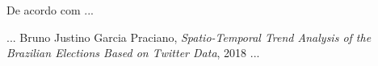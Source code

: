 De acordo com \cite{praciano2018spatio}...
\begin{thebibliography}{99}
...
 Bruno Justino Garcia Praciano, \emph{Spatio-Temporal Trend Analysis of the Brazilian Elections Based on Twitter Data}, 2018
...
\end{thebibliography}
